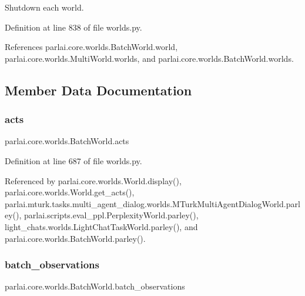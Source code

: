 \begin{DoxyVerb}Shutdown each world.\end{DoxyVerb}
 

Definition at line 838 of file worlds.\+py.



References parlai.\+core.\+worlds.\+Batch\+World.\+world, parlai.\+core.\+worlds.\+Multi\+World.\+worlds, and parlai.\+core.\+worlds.\+Batch\+World.\+worlds.



\subsection{Member Data Documentation}
\mbox{\label{classparlai_1_1core_1_1worlds_1_1BatchWorld_a89bd00f625520bf66dda7d113cf0b40e}} 
\subsubsection{\texorpdfstring{acts}{acts}}
{\footnotesize\ttfamily parlai.\+core.\+worlds.\+Batch\+World.\+acts}



Definition at line 687 of file worlds.\+py.



Referenced by parlai.\+core.\+worlds.\+World.\+display(), parlai.\+core.\+worlds.\+World.\+get\+\_\+acts(), parlai.\+mturk.\+tasks.\+multi\+\_\+agent\+\_\+dialog.\+worlds.\+M\+Turk\+Multi\+Agent\+Dialog\+World.\+parley(), parlai.\+scripts.\+eval\+\_\+ppl.\+Perplexity\+World.\+parley(), light\+\_\+chats.\+worlds.\+Light\+Chat\+Task\+World.\+parley(), and parlai.\+core.\+worlds.\+Batch\+World.\+parley().

\mbox{\label{classparlai_1_1core_1_1worlds_1_1BatchWorld_a6f13286dedb14f257e043339b543cdeb}} 
\subsubsection{\texorpdfstring{batch\+\_\+observations}{batch\_observations}}
{\footnotesize\ttfamily parlai.\+core.\+worlds.\+Batch\+World.\+batch\+\_\+observations}



